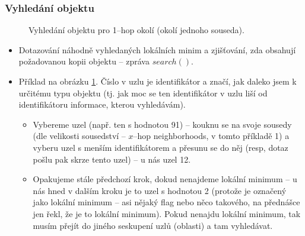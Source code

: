 \documentclass[11pt,a4paper]{article}
\begin{document}
\subsubsection*{Vyhledání objektu}
\begin{figure}[ht!]
\begin{center}
\caption{Vyhledání objektu pro 1--hop okolí (okolí jednoho souseda).}
\label{LMS_search}
\end{center}
\end{figure}
\begin{itemize}
\item Dotazování náhodně vyhledaných lokálních minim a zjišťování, zda obsahují požadovanou kopii objektu -- zpráva $search()$.
\item Příklad na obrázku \ref{LMS_search}. Číslo v uzlu je identifikátor a značí, jak daleko jsem k určitému typu objektu (tj. jak moc se ten identifikátor v uzlu liší od identifikátoru informace, kterou vyhledávám).
\begin{itemize}
\item Vybereme uzel (např. ten s hodnotou 91) -- kouknu se na svoje sousedy (dle velikosti sousedství -- $x$--hop neighborhoods, v tomto příkladě 1) a vyberu uzel s menším identifikátorem a přesunu se do něj (resp, dotaz pošlu pak skrze tento uzel) -- u nás uzel 12.
\item Opakujeme stále předchozí krok, dokud nenajdeme lokální minimum -- u nás hned v dalším kroku je to uzel s hodnotou 2 (protože je označený jako lokální minimum -- asi nějaký flag nebo něco takového, na přednášce jen řekl, že je to lokální minimum). Pokud nenajdu lokální minimum, tak musím přejít do jiného seskupení uzlů (oblasti) a tam vyhledávat.
\end{itemize}
\end{itemize}
\end{document}
